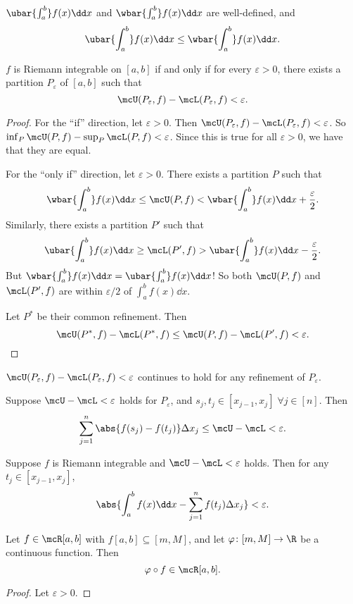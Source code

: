 \begin{corollary}
    $\ubar{\int_a^b} f(x) \dd x$ and $\wbar{\int_a^b} f(x) \dd x$
    are well-defined, and \[
        \ubar{\int_a^b} f(x) \dd x \le \wbar{\int_a^b} f(x) \dd x.
    \]
\end{corollary}

\begin{theorem*}
    $f$ is Riemann integrable on $[a, b]$ if and only if for every
    $\varepsilon > 0$, there exists a partition $P_\varepsilon$ of
    $[a, b]$ such that \[
        \mcU(P_\varepsilon, f) - \mcL(P_\varepsilon, f) < \varepsilon.
    \]
\end{theorem*}
\begin{proof}
    For the ``if'' direction, let $\varepsilon > 0$.
    Then $\mcU(P_\varepsilon, f) - \mcL(P_\varepsilon, f) < \varepsilon$.
    So $\inf_P \mcU(P, f) - \sup_P \mcL(P, f) < \varepsilon$.
    Since this is true for all $\varepsilon > 0$, we have that they are
    equal.

    For the ``only if'' direction, let $\varepsilon > 0$.
    There exists a partition $P$ such that \[
        \wbar{\int_a^b} f(x) \dd x
            \le \mcU(P, f)
            < \wbar{\int_a^b} f(x) \dd x + \frac{\varepsilon}{2}.
    \] Similarly, there exists a partition $P'$ such that \[
        \ubar{\int_a^b} f(x) \dd x
            \ge \mcL(P', f)
            > \ubar{\int_a^b} f(x) \dd x - \frac{\varepsilon}{2}.
    \] But $\wbar{\int_a^b} f(x) \dd x = \ubar{\int_a^b} f(x) \dd x$!
    So both $\mcU(P, f)$ and $\mcL(P', f)$ are within $\varepsilon/2$ of
    $\int_a^b f(x) \dd x$.

    Let $P^*$ be their common refinement.
    Then \[
        \mcU(P^*, f) - \mcL(P^*, f)
            \le \mcU(P, f) - \mcL(P', f)
            < \varepsilon. \qedhere
    \]
\end{proof}

\begin{remarks}
    \item $\mcU(P_\varepsilon, f) - \mcL(P_\varepsilon, f) < \varepsilon$
    continues to hold for any refinement of $P_\varepsilon$.
    \item Suppose $\mcU - \mcL < \varepsilon$ holds for $P_\varepsilon$,
    and $s_j, t_j \in [x_{j-1}, x_j] \;\forall j \in [n]$.
    Then \[
        \sum_{j=1}^n \abs{f(s_j) - f(t_j)} \Delta x_j
            \le \mcU - \mcL
            < \varepsilon.
    \]
    \item Suppose $f$ is Riemann integrable and $\mcU - \mcL < \varepsilon$
    holds.
    Then for any $t_j \in [x_{j-1}, x_j]$, \[
        \abs{\int_a^b f(x) \dd x - \sum_{j=1}^n f(t_j) \Delta x_j}
            < \varepsilon.
    \]
\end{remarks}

\begin{theorem*}
    Let $f \in \mcR[a, b]$ with $f[a, b] \subseteq [m, M]$, and
    let $\varphi\colon [m, M] \to \R$ be a continuous function.
    Then \[
        \varphi \circ f \in \mcR[a, b].
    \]
\end{theorem*}
\begin{proof}
    Let $\varepsilon > 0$.
\end{proof}
